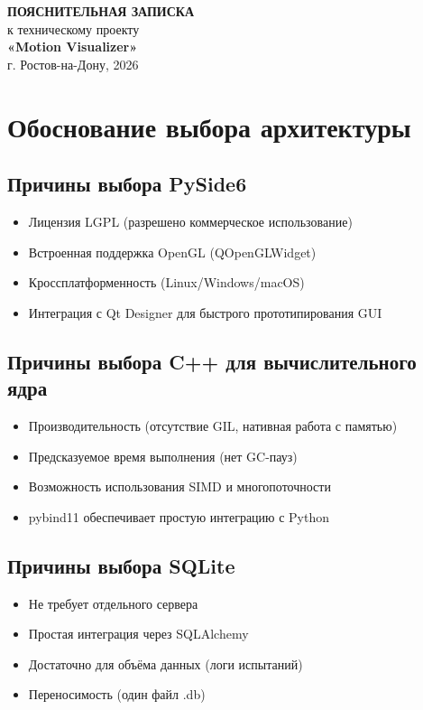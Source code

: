 \documentclass[a4paper,14pt]{extarticle}
\begin{document}
\begin{titlepage}
\begin{center}
\vspace*{2cm}
{\Large \textbf{ПОЯСНИТЕЛЬНАЯ ЗАПИСКА}} \\
\vspace{0.5cm}
{\large к техническому проекту} \\
\vspace{0.5cm}
{\huge \textbf{«Motion Visualizer»}} \\
\vspace{0.5cm}
\vfill
г. Ростов-на-Дону, 2026
\end{center}
\end{titlepage}

\section{Обоснование выбора архитектуры}

\subsection{Причины выбора PySide6}
\begin{itemize}
    \item Лицензия LGPL (разрешено коммерческое использование)
    \item Встроенная поддержка OpenGL (QOpenGLWidget)
    \item Кроссплатформенность (Linux/Windows/macOS)
    \item Интеграция с Qt Designer для быстрого прототипирования GUI
\end{itemize}

\subsection{Причины выбора C++ для вычислительного ядра}
\begin{itemize}
    \item Производительность (отсутствие GIL, нативная работа с памятью)
    \item Предсказуемое время выполнения (нет GC-пауз)
    \item Возможность использования SIMD и многопоточности
    \item pybind11 обеспечивает простую интеграцию с Python
\end{itemize}

\subsection{Причины выбора SQLite}
\begin{itemize}
    \item Не требует отдельного сервера
    \item Простая интеграция через SQLAlchemy
    \item Достаточно для объёма данных (логи испытаний)
    \item Переносимость (один файл .db)
\end{itemize}
\end{document}
